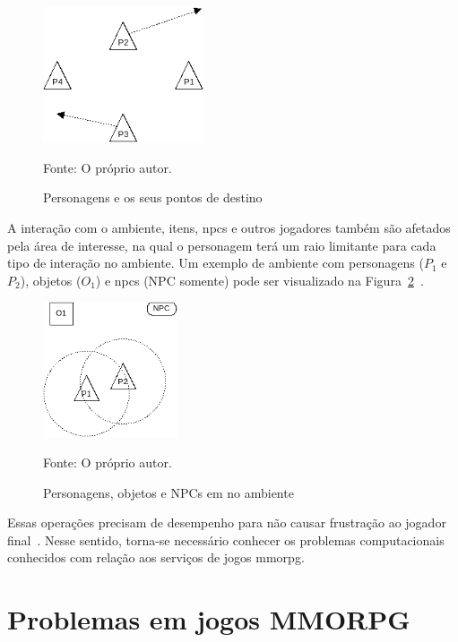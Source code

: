 \begin{figure}[htb!]
\caption{Personagens e os seus pontos de destino}
\label{fig:walk}
\includegraphics[height=4cm]{img/cap2/walk.png}
\centering

Fonte: O próprio autor.
\end{figure}



A interação com o ambiente, itens, \ac{npcs} e outros jogadores também são afetados pela área de interesse, na qual o personagem terá um raio limitante para cada tipo de interação no ambiente.
%
Um exemplo de ambiente com personagens ($P_1$ e $P_2$), objetos ($O_1$) e \ac{npcs} (NPC somente) pode ser visualizado na Figura~\ref{fig:obj_e_npc1}~\cite{albion_online_unite}.

\begin{figure}[htb!]
\caption{Personagens, objetos e NPCs em no ambiente}
\label{fig:obj_e_npc1}
\includegraphics[height=4cm]{img/cap2/obj_e_npc1.png}
\centering

Fonte: O próprio autor.
\end{figure}



Essas operações precisam de desempenho para não causar frustração ao jogador final~\cite{7008965}.
%
Nesse sentido, torna-se necessário conhecer os problemas computacionais conhecidos com relação aos serviços de jogos \ac{mmorpg}.



\section{Problemas em jogos MMORPG}
\label{sec:problemas}

